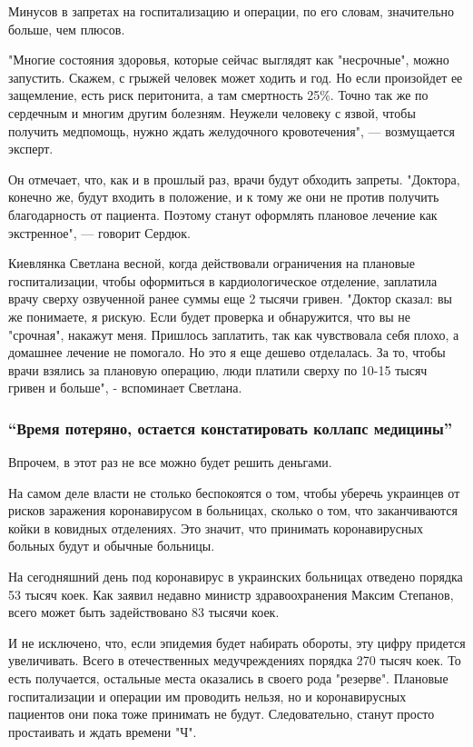 Минусов в запретах на госпитализацию и операции, по его словам, значительно больше, чем плюсов.

"Многие состояния здоровья, которые сейчас выглядят как "несрочные", можно
запустить. Скажем, с грыжей человек может ходить и год. Но если произойдет ее
защемление, есть риск перитонита, а там смертность 25\%. Точно так же по
сердечным и многим другим болезням. Неужели человеку с язвой, чтобы получить
медпомощь, нужно ждать желудочного кровотечения", --- возмущается эксперт.

Он отмечает, что, как и в прошлый раз, врачи будут обходить запреты. "Доктора,
конечно же, будут входить в положение, и к тому же они не против получить
благодарность от пациента. Поэтому станут оформлять плановое лечение как
экстренное", --- говорит Сердюк.

Киевлянка Светлана весной, когда  действовали ограничения на плановые
госпитализации, чтобы оформиться в кардиологическое отделение, заплатила врачу
сверху озвученной ранее суммы еще 2 тысячи гривен. "Доктор сказал: вы же
понимаете, я рискую. Если будет проверка и обнаружится, что вы не "срочная",
накажут меня. Пришлось заплатить, так как чувствовала себя плохо, а домашнее
лечение не помогало. Но это я еще дешево отделалась. За то, чтобы врачи взялись
за плановую операцию, люди платили сверху по 10-15 тысяч гривен и больше", -
вспоминает Светлана. 

\subsubsection{\enquote{Время потеряно, остается констатировать коллапс медицины}}

Впрочем, в этот раз не все можно будет решить деньгами.

На самом деле власти не столько беспокоятся о том, чтобы уберечь украинцев от
рисков заражения коронавирусом в больницах, сколько о том, что заканчиваются
койки в ковидных отделениях. Это значит, что принимать коронавирусных больных
будут и обычные больницы.

На сегодняшний день под коронавирус в украинских больницах отведено порядка 53
тысяч коек. Как заявил недавно министр здравоохранения Максим Степанов, всего
может быть задействовано 83 тысячи коек. 

И не исключено, что, если эпидемия будет набирать обороты, эту цифру придется
увеличивать. Всего в отечественных медучреждениях порядка 270 тысяч коек. То
есть получается, остальные места оказались в своего рода "резерве". Плановые
госпитализации и операции им проводить нельзя, но и коронавирусных пациентов
они пока тоже принимать не будут. Следовательно, станут просто простаивать и
ждать времени "Ч".

